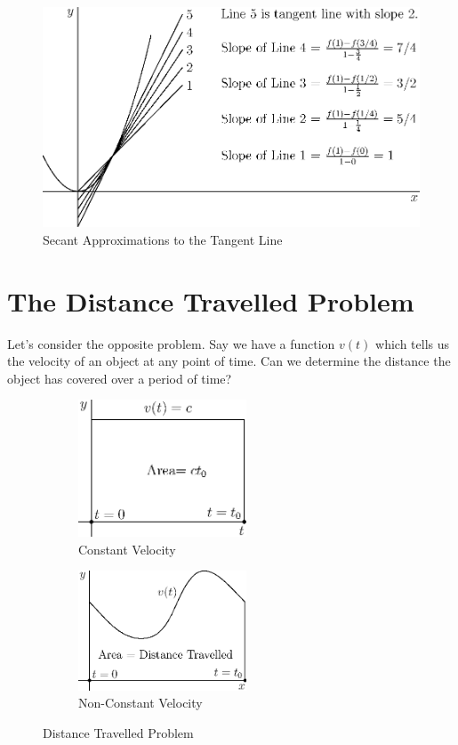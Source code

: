 \documentclass[fleqn]{report}
\begin{document}
\begin{figure}[ht]
\centering
\includegraphics[width=12cm]{figure13.eps}
\caption{Secant Approximations to the Tangent Line}
\label{Secant Approximations 1}
\end{figure}

\section*{The Distance Travelled Problem}

Let's consider the opposite problem. Say we have a function
$v(t)$ which tells us the velocity of an object at any point
of time. Can we determine the distance the object has covered
over a period of time? 

\begin{figure}[ht]
\centering
\begin{subfigure}{.5\textwidth}
 \centering
 \includegraphics[width=5cm]{figure14.eps}
 \caption{Constant Velocity}
\end{subfigure}%
\begin{subfigure}{.5\textwidth}
 \centering
 \includegraphics[width=5cm]{figure15.eps}
 \caption{Non-Constant Velocity}
\end{subfigure}
\caption{Distance Travelled Problem}
\label{Distance Travelled 1}
\end{figure}
\end{document}

